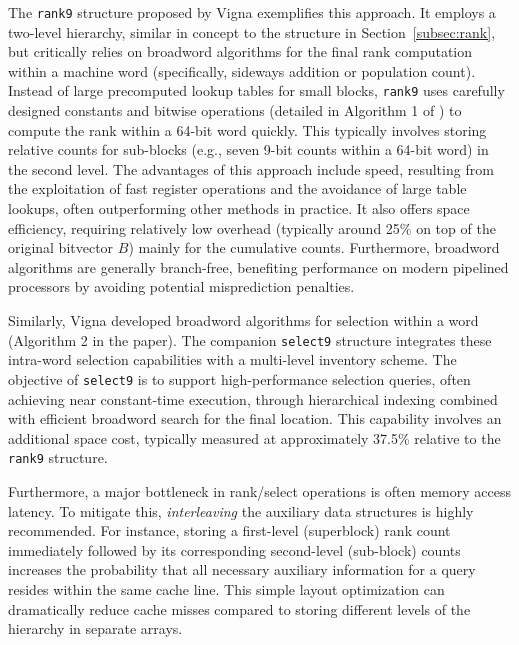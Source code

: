 The \texttt{rank9} structure proposed by Vigna \cite{vigna2008broadword} exemplifies this approach. It employs a two-level hierarchy, similar in concept to the structure in Section~\ref{subsec:rank}, but critically relies on broadword algorithms for the final \textsf{rank} computation within a machine word (specifically, sideways addition or population count). Instead of large precomputed lookup tables for small blocks, \texttt{rank9} uses carefully designed constants and bitwise operations (detailed in Algorithm 1 of \cite{vigna2008broadword}) to compute the \textsf{rank} within a 64-bit word quickly. This typically involves storing relative counts for sub-blocks (e.g., seven 9-bit counts within a 64-bit word) in the second level. The advantages of this approach include speed, resulting from the exploitation of fast register operations and the avoidance of large table lookups, often outperforming other methods in practice. It also offers space efficiency, requiring relatively low overhead (typically around 25\% on top of the original bitvector $B$) mainly for the cumulative counts. Furthermore, broadword algorithms are generally branch-free, benefiting performance on modern pipelined processors by avoiding potential misprediction penalties.

Similarly, Vigna \cite{vigna2008broadword} developed broadword algorithms for selection within a word (Algorithm 2 in the paper). The companion \texttt{select9} structure integrates these intra-word selection capabilities with a multi-level inventory scheme. The objective of \texttt{select9} is to support high-performance selection queries, often achieving near constant-time execution, through hierarchical indexing combined with efficient broadword search for the final location. This capability involves an additional space cost, typically measured at approximately 37.5\% relative to the \texttt{rank9} structure.

Furthermore, a major bottleneck in \textsf{rank}/\textsf{select} operations is often memory access latency. To mitigate this, \emph{interleaving} the auxiliary data structures is highly recommended. For instance, storing a first-level (superblock) rank count immediately followed by its corresponding second-level (sub-block) counts increases the probability that all necessary auxiliary information for a query resides within the same cache line. This simple layout optimization can dramatically reduce cache misses compared to storing different levels of the hierarchy in separate arrays.

